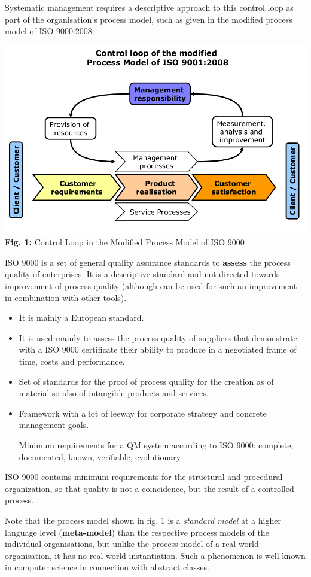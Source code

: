 \documentclass[11pt,a4paper]{article}
\begin{document}
Systematic management requires a descriptive approach to this control loop as
part of the organisation's process model, such as given in the modified
process model of ISO 9000:2008.
\begin{center}
  \includegraphics[width=.8\textwidth]{2.png}\\ \textbf{Fig. 1:} Control Loop
  in the Modified Process Model of ISO 9000
\end{center}
ISO 9000 is a set of general quality assurance standards to \textbf{assess}
the process quality of enterprises. It is a descriptive standard and not
directed towards improvement of process quality (although can be used for such
an improvement in combination with other tools).
\begin {itemize} [noitemsep]
\item It is mainly a European standard.
\item It is used mainly to assess the process quality of suppliers that
  demonstrate with a ISO 9000 certificate their ability to produce in a
  negotiated frame of time, costs and performance. 
\item Set of standards for the proof of process quality for the creation as of
  material so also of intangible products and services.
\item Framework with a lot of leeway for corporate strategy and concrete
  management goals.

  Minimum requirements for a QM system according to ISO 9000: complete,
  documented, known, verifiable, evolutionary
\end {itemize}
ISO 9000 contains minimum requirements for the structural and procedural
organization, so that quality is not a coincidence, but the result of a
controlled process.

Note that the process model shown in fig. 1 is a \emph{standard model} at a
higher language level (\textbf{meta-model}) than the respective process models
of the individual organisations, but unlike the process model of a real-world
organisation, it has no real-world instantiation. Such a phenomenon is well
known in computer science in connection with abstract classes.
\end{document}
